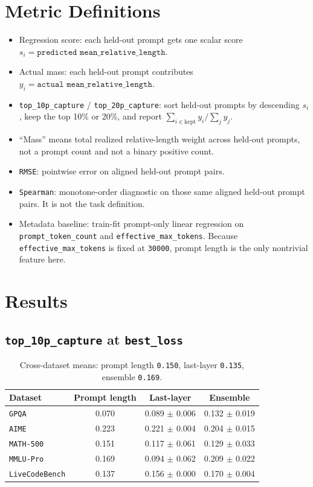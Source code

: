 \documentclass[11pt]{article}
\begin{document}
\section{Metric Definitions}

\begin{itemize}
\item Regression score:
  each held-out prompt gets one scalar score
  $s_i = \texttt{predicted mean\_relative\_length}$.
\item Actual mass:
  each held-out prompt contributes
  $y_i = \texttt{actual mean\_relative\_length}$.
\item \texttt{top\_10p\_capture} / \texttt{top\_20p\_capture}:
  sort held-out prompts by descending $s_i$, keep the top 10\% or 20\%, and
  report $\sum_{i \in \mathrm{kept}} y_i / \sum_j y_j$.
\item ``Mass'' means total realized relative-length weight across held-out
  prompts, not a prompt count and not a binary positive count.
\item \texttt{RMSE}:
  pointwise error on aligned held-out prompt pairs.
\item \texttt{Spearman}:
  monotone-order diagnostic on those same aligned held-out prompt pairs. It is
  not the task definition.
\item Metadata baseline:
  train-fit prompt-only linear regression on \texttt{prompt\_token\_count} and
  \texttt{effective\_max\_tokens}. Because \texttt{effective\_max\_tokens} is
  fixed at \texttt{30000}, prompt length is the only nontrivial feature here.
\end{itemize}

\section{Results}

\subsection*{\texttt{top\_10p\_capture} at \texttt{best\_loss}}

\begin{table}[h]
\centering
\small
\begin{tabular}{lccc}
\toprule
Dataset & Prompt length & Last-layer & Ensemble \\
\midrule
\texttt{GPQA} & 0.070 & 0.089 $\pm$ 0.006 & 0.132 $\pm$ 0.019 \\
\texttt{AIME} & 0.223 & 0.221 $\pm$ 0.004 & 0.204 $\pm$ 0.015 \\
\texttt{MATH-500} & 0.151 & 0.117 $\pm$ 0.061 & 0.129 $\pm$ 0.033 \\
\texttt{MMLU-Pro} & 0.169 & 0.094 $\pm$ 0.062 & 0.209 $\pm$ 0.022 \\
\texttt{LiveCodeBench} & 0.137 & 0.156 $\pm$ 0.000 & 0.170 $\pm$ 0.004 \\
\bottomrule
\end{tabular}
\caption{Cross-dataset means: prompt length \texttt{0.150}, last-layer \texttt{0.135}, ensemble \texttt{0.169}.}
\end{table}
\end{document}
